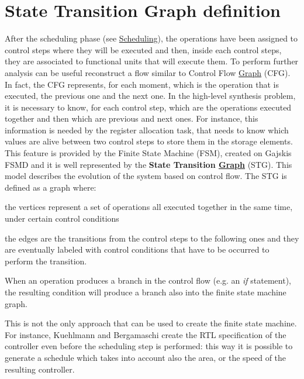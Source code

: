 \hypertarget{src_HLS_controller_stg_stg_definition}{}\section{State Transition Graph definition}\label{src_HLS_controller_stg_stg_definition}
After the scheduling phase (see \hyperlink{src_HLS_scheduling_general}{Scheduling}), the operations have been assigned to control steps where they will be executed and then, inside each control steps, they are associated to functional units that will execute them. To perform further analysis can be useful reconstruct a flow similar to Control Flow \hyperlink{structGraph}{Graph} (C\+FG). In fact, the C\+FG represents, for each moment, which is the operation that is executed, the previous one and the next one. In the high-\/level synthesis problem, it is necessary to know, for each control step, which are the operations executed together and then which are previous and next ones. For instance, this information is needed by the register allocation task, that needs to know which values are alive between two control steps to store them in the storage elements. This feature is provided by the Finite State Machine (F\+SM), created on Gajski\textquotesingle{}s F\+S\+MD and it is well represented by the {\bfseries State Transition \hyperlink{structGraph}{Graph}} (S\+TG). This model describes the evolution of the system based on control flow. The S\+TG is defined as a graph where\+:
\begin{DoxyItemize}
\item the vertices represent a set of operations all executed together in the same time, under certain control conditions
\item the edges are the transitions from the control steps to the following ones and they are eventually labeled with control conditions that have to be occurred to perform the transition.
\end{DoxyItemize}

When an operation produces a branch in the control flow (e.\+g. an {\itshape if} statement), the resulting condition will produce a branch also into the finite state machine graph.

This is not the only approach that can be used to create the finite state machine. For instance, Kuehlmann and Bergamaschi create the R\+TL specification of the controller even before the scheduling step is performed\+: this way it is possible to generate a schedule which takes into account also the area, or the speed of the resulting controller. 